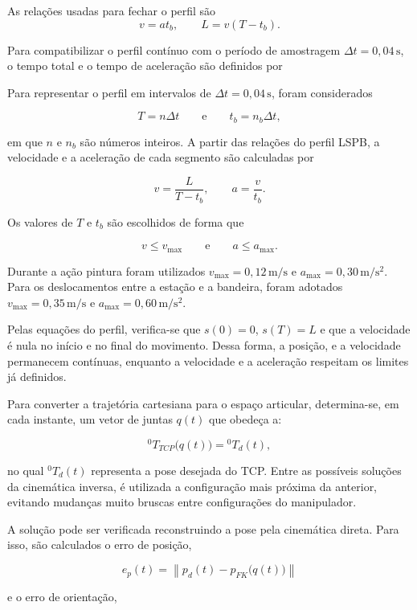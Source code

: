 As relações usadas para fechar o perfil são
\begin{equation}
v=a t_b,
\qquad
L=v(T-t_b).
\label{eq:lspb_relacoes}
\end{equation}

Para compatibilizar o perfil contínuo com o período de amostragem \(\Delta t=0{,}04\,\mathrm{s}\), o tempo total e o tempo de aceleração são definidos por

Para representar o perfil em intervalos de \(\Delta t=0{,}04\,\mathrm{s}\), foram considerados

\[
T=n\Delta t
\qquad \text{e} \qquad
t_b=n_b\Delta t,
\]

em que \(n\) e \(n_b\) são números inteiros. A partir das relações do perfil LSPB, a velocidade e a aceleração de cada segmento são calculadas por

\[
v=\frac{L}{T-t_b},
\qquad
a=\frac{v}{t_b}.
\]

Os valores de \(T\) e \(t_b\) são escolhidos de forma que

\[
v\leq v_{\max}
\qquad \text{e} \qquad
a\leq a_{\max}.
\]

Durante a ação pintura foram utilizados \(v_{\max}=0{,}12\,\mathrm{m/s}\) e \(a_{\max}=0{,}30\,\mathrm{m/s^2}\). Para os deslocamentos entre a estação e a bandeira, foram adotados \(v_{\max}=0{,}35\,\mathrm{m/s}\) e \(a_{\max}=0{,}60\,\mathrm{m/s^2}\).

Pelas equações do perfil, verifica-se que \(s(0)=0\), \(s(T)=L\) e que a velocidade é nula no início e no final do movimento. Dessa forma, a posição, e a velocidade permanecem contínuas, enquanto a velocidade e a aceleração respeitam os limites já definidos.

Para converter a trajetória cartesiana para o espaço articular, determina-se, em cada instante, um vetor de juntas \(q(t)\) que obedeça a:

\[
{}^{0}T_{TCP}\bigl(q(t)\bigr)={}^0T_d(t),
\]

no qual \({}^0T_d(t)\) representa a pose desejada do TCP. Entre as possíveis soluções da cinemática inversa, é utilizada a configuração mais próxima da anterior, evitando mudanças muito bruscas entre configurações do manipulador.

A solução pode ser verificada reconstruindo a pose pela cinemática direta. Para isso, são calculados o erro de posição,

\[
e_p(t)=
\left\|
p_d(t)-p_{FK}\bigl(q(t)\bigr)
\right\|
\]

e o erro de orientação,

